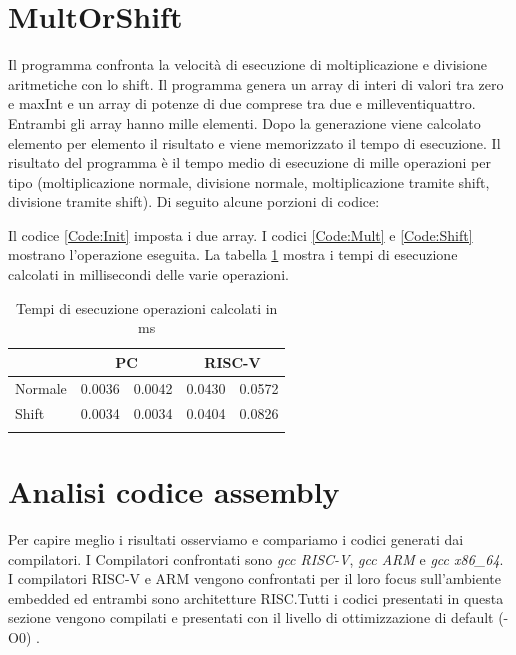 \documentclass[12pt, a4paper]{report}
\begin{document}
\section{MultOrShift}
Il programma confronta la velocità di esecuzione di moltiplicazione e divisione aritmetiche con lo shift. Il programma genera un array di interi di valori tra zero e maxInt e un array di potenze di due comprese tra due e milleventiquattro. Entrambi gli array hanno mille elementi. Dopo la generazione viene calcolato elemento per elemento il risultato e viene memorizzato il tempo di esecuzione. Il risultato del programma è il tempo medio di esecuzione di mille operazioni per tipo (moltiplicazione normale, divisione normale, moltiplicazione tramite shift, divisione tramite shift). Di seguito alcune porzioni di codice:





Il codice \ref{Code:Init} imposta i due array. I codici \ref{Code:Mult} e \ref{Code:Shift} mostrano l'operazione eseguita.
La tabella \ref{Tab:tempi_esecuzioneMS} mostra i tempi di esecuzione calcolati in millisecondi delle varie operazioni.

\begin{table}[ht]
\centering
\begin{tabular}{lcccc}
\cline{2-5}
\multicolumn{1}{l|}{} & \multicolumn{2}{c|}{PC} & \multicolumn{2}{c|}{RISC-V} \\ \hline
\multicolumn{1}{|l|}{Normale} & \multicolumn{1}{c|}{0.0036} & \multicolumn{1}{c|}{0.0042} & \multicolumn{1}{c|}{0.0430} & \multicolumn{1}{c|}{0.0572} \\ \hline
\multicolumn{1}{|l|}{Shift} & \multicolumn{1}{c|}{0.0034} & \multicolumn{1}{c|}{0.0034} & \multicolumn{1}{c|}{0.0404} & \multicolumn{1}{c|}{0.0826} \\ \hline
 & \multicolumn{1}{l}{} & \multicolumn{1}{l}{} & \multicolumn{1}{l}{} & \multicolumn{1}{l}{} 
\end{tabular}
	\caption{Tempi di esecuzione operazioni calcolati in ms}
	\label{Tab:tempi_esecuzioneMS}
\end{table}
	
	
\section{Analisi codice assembly}
Per capire meglio i risultati osserviamo e compariamo i codici generati dai compilatori. I Compilatori confrontati sono \textit{gcc RISC-V}, \textit{gcc ARM} e \textit{gcc x86\_64}. I compilatori RISC-V e ARM vengono confrontati per il loro focus sull'ambiente embedded ed entrambi sono architetture RISC.Tutti i codici presentati in questa sezione vengono compilati e presentati con il livello di ottimizzazione di default (-O0) \cite{ConfrontoISABook}.
\end{document}
